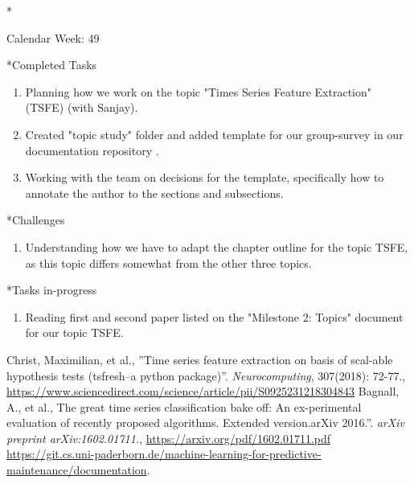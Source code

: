 \documentclass[11pt,a4paper]{article}
\begin{document}
\newpage
\begin{section}*{Calendar Week: 49 \hfill \date{4 December, 2020}}
	
	\begin{subsection}*{Completed Tasks}
		\begin{enumerate}
			\item 
			Planning how we work on the topic "Times Series Feature Extraction" (TSFE) (with Sanjay).
			\item 
			Created "topic study" folder and added template for our group-survey in our documentation repository \cite{documentation-repository}.
			\item
			Working with the team on decisions for the template, specifically how to annotate the author to the sections and subsections.
	\end{enumerate}
	\end{subsection}
	
	\begin{subsection}*{Challenges}
		\begin{enumerate}
			\item
			Understanding how we have to adapt the chapter outline for the topic TSFE, as this topic differs somewhat from the other three topics.
		\end{enumerate}
	\end{subsection}
	
	\begin{subsection}*{Tasks in-progress}
		\begin{enumerate}
		 \item Reading first \cite{paper1} and second paper \cite{paper2} listed on the "Milestone 2: Topics" document for our topic TSFE.
		\end{enumerate}
	\end{subsection}
	
	\begin{thebibliography}{9}
		{Christ, Maximilian, et al.},
		”Time series feature extraction on basis of scal-able  hypothesis  tests  (tsfresh–a  python  package)”. \textit{Neurocomputing},  
		307(2018): 72-77.,
		\href{https://www.sciencedirect.com/science/article/pii/S0925231218304843}{https://www.sciencedirect.com/science/article/pii/S0925231218304843}
		{Bagnall, A., et al.},
		The great time series classification bake off:  An ex-perimental evaluation of recently proposed algorithms.  Extended version.arXiv 2016.”.
		\textit{arXiv preprint arXiv:1602.01711.},
		\href{https://arxiv.org/pdf/1602.01711.pdf}{https://arxiv.org/pdf/1602.01711.pdf}
		\href{https://git.cs.uni-paderborn.de/machine-learning-for-predictive-maintenance/documentation}{https://git.cs.uni-paderborn.de/machine-learning-for-predictive-maintenance/documentation}.
	\end{thebibliography}
\end{section}
\end{document}
